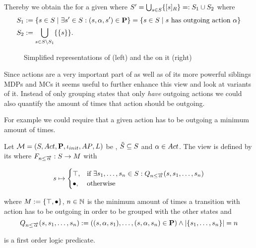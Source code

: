 \documentclass[preview]{standalone}
\begin{document}
Thereby we obtain the \viewN \viewhasoutaction for a given \chgphN \chgph where ${S}' = \bigcup_{{s} \in {S}} \{{{[{s}]_{{R}}}}\} =: {S}_1 \cup {S}_2$ where
\begin{align*}
	 {S}_1 &:= \{{s} \in {S} \mid \exists {s}' \in {S}: ({s}, {\alpha}, {s}') \in {\ensuremath{{\textbf{P}}}}\} = \{{s} \in {S} \mid {s} \text{ has outgoing action \ensuremath{{\alpha}}}\} \\
	{S}_2 &:= {\bigcup_{{s} \in {S} \setminus {S}_1}\{\{{s}\}\}}.
\end{align*}

\begin{figure}[h]
	\begin{minipage}{.5\textwidth}
		\hspace{5mm}
		
	\end{minipage}%
	\begin{minipage}{.5\textwidth}
		\hspace{5mm}
		
	\end{minipage}
	\caption{Simplified representations of \mdp (left) and the \viewN \viewhasoutaction on it (right)}
	\label{fig:outActHasAfter}  
\end{figure}





Since actions are a very important part of \chgphsN as well as of its more powerful siblings MDPs and MCs it seems useful to further enhance this view and look at variants of it. Instead of only grouping states that only \emph{have} outgoing actions we could also quantify the amount of times that action should be outgoing.



For example we could require that a given action has to be outgoing a minimum amount of times. 

\begin{definition}
	Let ${{{\mathcal{M}}}} = {{({S}, {Act}, {\textbf{P}}, {\iota_{init}}, {AP}, {L})}}$ be \achgphN, ${\tilde{{S}}} \subseteq {S}$ and ${\alpha} \in {Act}$. The view \viewminoutaction is defined by its \grpfctN where ${{F_{{{n}\leq{\overrightarrow{\ensuremath{{\alpha}}}}}}}} : {S} \to {M}$ with
	
	\[
	{s} \mapsto
	\begin{cases}
			{\top},				& \text{if } \exists {s}_1, \dots, {s}_{n} \in {S}:  {Q_{{n}\leq{\overrightarrow{\ensuremath{{\alpha}}}}}({s},{s}_1, \dots, {s}_{{n}})}\\
			{\bullet},          	& \text{otherwise}
		\end{cases}
	\]
	
	where ${{M}} := {\{{\top}, {\bullet}\}}$,
	 ${n} \in {\mathbb{N}}$ is the minimum amount of times a transition with action \action has to be outgoing in order to be grouped with the other states and
	\[
	{Q_{{n}\leq{\overrightarrow{\ensuremath{{\alpha}}}}}({s},{s}_1, \dots, {s}_{{n}})} := (({s}, {\alpha}, {s}_1), \dots, ({s}, {\alpha}, {s}_{n}) \in {\ensuremath{{\textbf{P}}}}) \land |\{{s}_1, \dots, {s}_{n}\}| = {n}
	\]
	
	is a first order logic predicate.
	\label{def:minoutaction}
\end{definition}
\end{document}
